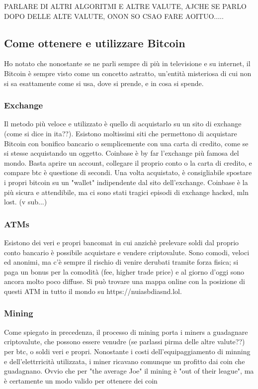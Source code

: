\documentclass {article}
\begin{document}
PARLARE DI ALTRI ALGORITMI E ALTRE VALUTE, AJCHE SE PARLO DOPO DELLE ALTE VALUTE, ONON SO CSAO FARE AOITUO.....

\subsection {Come ottenere e utilizzare Bitcoin}

Ho notato che nonostante se ne parli sempre di più in televisione e su internet, il Bitcoin è sempre visto come un concetto astratto, un'entità misteriosa di cui non si sa esattamente come si usa, dove si prende, e in cosa si spende.

\subsubsection {Exchange}

Il metodo più veloce e utilizzato è quello di acquistarlo su un sito di exchange (come si dice in ita??). Esistono moltissimi siti che permettono di acquistare Bitcoin con bonifico bancario o semplicemente con una carta di credito, come se si stesse acquistando un oggetto.
Coinbase è by far l'exchange più famosa del mondo. Basta aprire un account, collegare il proprio conto o la carta di credito, e compare btc è questione di secondi.
Una volta acquistato, è consigliabile spostare i propri bitcoin su un "wallet" indipendente dal sito dell'exchange. Coinbase è la più sicura e attendibile, ma ci sono stati tragici episodi di exchange hacked, mln lost. (v sub...)

\subsubsection {ATMs}

Esistono dei veri e propri bancomat in cui anzichè prelevare soldi dal proprio conto bancario è possibile acquistare e vendere criptovalute. Sono comodi, veloci ed anonimi, ma c'è sempre il rischio di venire derubati tramite forza fisica; si paga un bonus per la comodità (fee, higher trade price) e al giorno d'oggi sono ancora molto poco diffuse. Si può trovare una mappa online con la posizione di questi ATM in tutto il mondo su https://nuiasbdiasnd.lol.

\subsubsection {Mining}

Come spiegato in precedenza, il processo di mining porta i miners a guadagnare criptovalute, che possono essere venudre (se parlassi pirma delle altre valute??) per btc, o soldi veri e propri.
Nonostante i costi dell'equipaggiamento di minning e dell'elettrricità utilizzata, i miner ricavano comunque un profitto dai coin che guadagnano. Ovvio che per "the average Joe" il mining è "out of their league", ma è certamente un modo valido per ottenere dei coin
\end{document}
